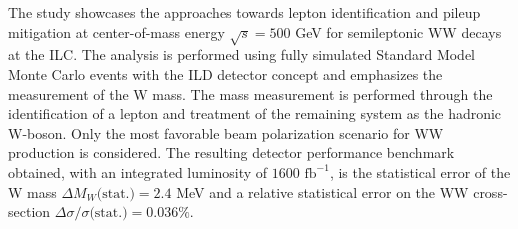 %

%

 The study showcases the approaches towards lepton identification and pileup mitigation at center-of-mass energy $\sqrt{s} = 500$ GeV for semileptonic WW decays at the ILC. The analysis is performed using fully simulated Standard Model Monte Carlo events with the ILD detector concept and emphasizes the measurement of the W mass. The mass measurement is performed through the identification of a lepton and treatment of the remaining system as the hadronic W-boson. Only the most favorable beam polarization scenario for WW production is considered. The resulting detector performance benchmark obtained, with an integrated luminosity of $1600 \, \, \text{fb}^{-1}$, is the statistical error of the W mass $\Delta M_W\text{(stat.)} =  2.4 $ MeV and a relative statistical error on the WW cross-section $\Delta \sigma / \sigma \text{(stat.)} = 0.036\% $. 


